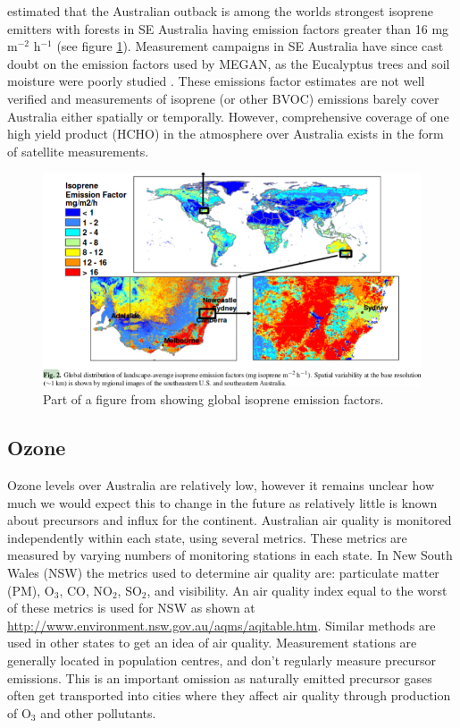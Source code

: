   \cite{Guenther2006} estimated that the Australian outback is among the worlds strongest isoprene emitters with forests in SE Australia having emission factors greater than 16 mg m$^{-2}$ h$^{-1}$ (see figure \ref{LR:Aus:fig_MEGAN_EF}).
  Measurement campaigns in SE Australia have since cast doubt on the emission factors used by MEGAN, as the Eucalyptus trees and soil moisture were poorly studied \cite{Emmerson2016}.
  These emissions factor estimates are not well verified and measurements of isoprene (or other BVOC) emissions barely cover Australia either spatially or temporally.
  However, comprehensive coverage of one high yield product (HCHO) in the atmosphere over Australia exists in the form of satellite measurements.
  
  \begin{figure}
    \includegraphics[width=\textwidth]{Figures/MeganIsoprene1.png}
    \caption{ Part of a figure from \cite{Guenther2006} showing global isoprene emission factors. }
    \label{LR:Aus:fig_MEGAN_EF}
  \end{figure}
  
  
  \subsection{Ozone}
    Ozone levels over Australia are relatively low, however it remains unclear how much we would expect this to change in the future as relatively little is known about precursors and influx for the continent.
    Australian air quality is monitored independently within each state, using several metrics.
    These metrics are measured by varying numbers of monitoring stations in each state.
    In New South Wales (NSW) the metrics used to determine air quality are: particulate matter (PM), O$_3$, CO, NO$_2$, SO$_2$, and visibility.
    An air quality index equal to the worst of these metrics is used for NSW as shown at \url{http://www.environment.nsw.gov.au/aqms/aqitable.htm}.
    Similar methods are used in other states to get an idea of air quality.
    Measurement stations are generally located in population centres, and don't regularly measure precursor emissions. 
    This is an important omission as naturally emitted precursor gases often get transported into cities where they affect air quality through production of O$_3$ and other pollutants.
    
